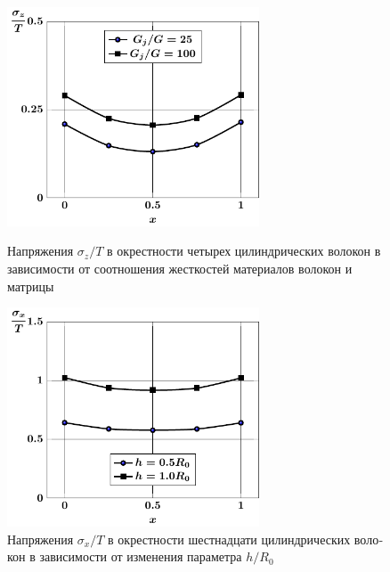 \begin{russian}
\begin{figure}[h!]
\centering\footnotesize
\parbox[b]{7.5cm}{\centering\includegraphics[width=7.5cm]{inclusion-4-z-g.pdf}
\caption{Напряжения $\sigma_z/T$ в окрестности четырех цилиндрических волокон в зависимости от соотношения жесткостей материалов волокон и матрицы
\label{f:7:60}}}\hfil\hfil
\parbox[b]{7.5cm}{\centering\includegraphics[width=7.5cm]{inclusion-16-x-h.pdf}
\caption{Напряжения $\sigma_x/T$ в окрестности шестнадцати цилиндрических волокон в зависимости от изменения параметра $h/R_0$
\label{f:7:61}}}
\end{figure}

%


\end{russian}
